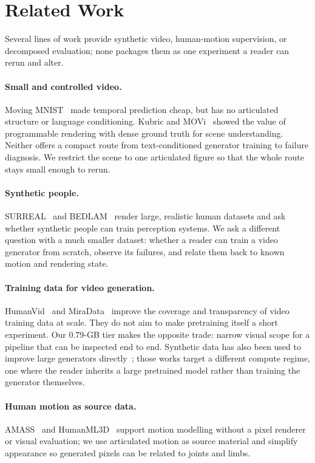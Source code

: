 \documentclass[11pt]{article}
\begin{document}
\section{Related Work}
Several lines of work provide synthetic video, human-motion supervision, or decomposed evaluation; none
packages them as one experiment a reader can rerun and alter.

\paragraph{Small and controlled video.} Moving MNIST~\cite{srivastava2015unsupervised} made temporal prediction
cheap, but has no articulated structure or language conditioning. Kubric and MOVi~\cite{greff2022kubric} showed
the value of programmable rendering with dense ground truth for scene understanding. Neither offers a compact
route from text-conditioned generator training to failure diagnosis. We restrict the scene to one articulated
figure so that the whole route stays small enough to rerun.

\paragraph{Synthetic people.} SURREAL~\cite{varol2017surreal} and BEDLAM~\cite{black2023bedlam} render large,
realistic human datasets and ask whether synthetic people can train perception systems. We ask a different
question with a much smaller dataset: whether a reader can train a video generator from scratch, observe its
failures, and relate them back to known motion and rendering state.

\paragraph{Training data for video generation.} HumanVid~\cite{wang2024humanvid} and
MiraData~\cite{ju2024miradata} improve the coverage and transparency of video training data at scale. They do
not aim to make pretraining itself a short experiment. Our 0.79-GB tier makes the opposite trade: narrow visual
scope for a pipeline that can be inspected end to end. Synthetic data has also been used to improve large
generators directly~\cite{zhao2025synthetic,jin2026dynavid}; those works target a different compute regime, one
where the reader inherits a large pretrained model rather than training the generator themselves.

\paragraph{Human motion as source data.} AMASS~\cite{mahmood2019amass} and HumanML3D~\cite{guo2022humanml3d}
support motion modelling without a pixel renderer or visual evaluation; we use articulated motion as source
material and simplify appearance so generated pixels can be related to joints and limbs.
\end{document}
